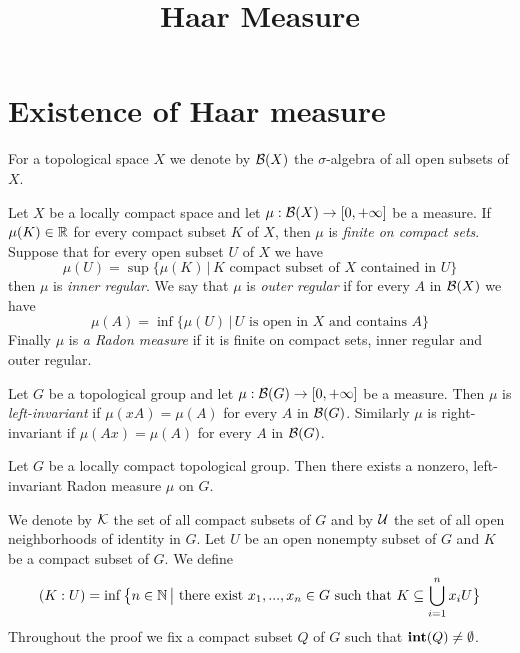



\title{Haar Measure}
\date{}
\maketitle

\section{Existence of Haar measure}
\noindent
For a topological space $X$ we denote by ${\mathcal B}(X)$ the $\sigma$-algebra of all open subsets of $X$.

\begin{definition}
Let $X$ be a locally compact space and let $\mu:{\mathcal B}(X)\rightarrow [0,+\infty]$ be a measure. If $\mu(K)\in {\mathbb R}$ for every compact subset $K$ of $X$, then $\mu$ is \textit{finite on compact sets}. Suppose that for every open subset $U$ of $X$ we have
$$\mu(U) = \sup \big\{\mu(K)\,\big|\,K\mbox{ compact subset of }X\mbox{ contained in }U\big\}$$
then $\mu$ is \textit{inner regular}. We say that $\mu$ is \textit{outer regular} if for every $A$ in ${\mathcal B}(X)$ we have
$$\mu(A) = \inf \big\{\mu(U)\,\big|\,U\mbox{ is open in }X\mbox{ and contains }A\big\}$$
Finally $\mu$ is \textit{a Radon measure} if it is finite on compact sets, inner regular and outer regular. 
\end{definition}

\begin{definition}
Let $G$ be a topological group and let $\mu:{\mathcal B}(G)\rightarrow [0,+\infty]$ be a measure. Then $\mu$ is \textit{left-invariant} if $\mu(xA) = \mu(A)$ for every $A$ in ${\mathcal B}(G)$. Similarly $\mu$ is right-invariant if $\mu(Ax) = \mu(A)$ for every $A$ in ${\mathcal B}(G)$.
\end{definition}

\begin{theorem}
Let $G$ be a locally compact topological group. Then there exists a nonzero, left-invariant Radon measure $\mu$ on $G$.
\end{theorem}
\noindent
We denote by ${\mathcal K}$ the set of all compact subsets of $G$ and by ${\mathcal U}$ the set of all open neighborhoods of identity in $G$. Let $U$ be an open nonempty subset of $G$ and $K$ be a compact subset of $G$. We define
$$(K:U) = \inf \big\{n\in {\mathbb N}\,\big|\mbox{ there exist }x_1,...,x_n\in G\mbox{ such that }K\subseteq \bigcup_{i=1}^nx_iU\big\}$$
Throughout the proof we fix a compact subset $Q$ of $G$ such that $\mathbf{int}(Q) \neq \emptyset$.

